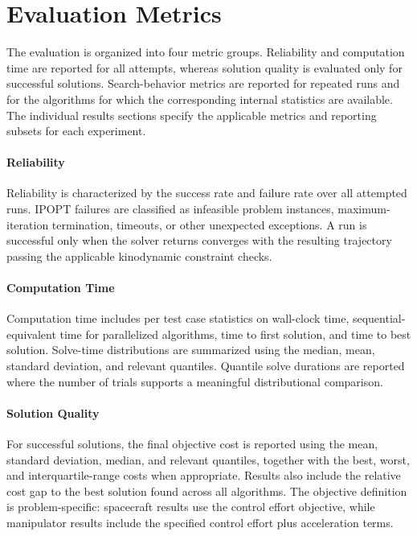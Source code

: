 \section{Evaluation Metrics}
\label{sec:setup_metrics}

The evaluation is organized into four metric groups. 
Reliability and computation time are reported for all attempts, whereas solution quality is evaluated only for successful solutions. 
Search-behavior metrics are reported for repeated runs and for the algorithms for which the corresponding internal statistics are available. 
The individual results sections specify the applicable metrics and reporting subsets for each experiment.

\paragraph{Reliability}
Reliability is characterized by the success rate and failure rate over all attempted runs. 
\ac{IPOPT} failures are classified as infeasible problem instances, maximum-iteration termination, timeouts, or other unexpected exceptions. 
A run is successful only when the solver returns converges with the resulting trajectory passing the applicable kinodynamic constraint checks.

\paragraph{Computation Time}
Computation time includes per test case statistics on wall-clock time, sequential-equivalent time for parallelized algorithms, time to first solution, and time to best solution. 
Solve-time distributions are summarized using the median, mean, standard deviation, and relevant quantiles. 
Quantile solve durations are reported where the number of trials supports a meaningful distributional comparison.

\paragraph{Solution Quality}
For successful solutions, the final objective cost is reported using the mean, standard deviation, median, and relevant quantiles, together with the best, worst, and interquartile-range costs when appropriate. 
Results also include the relative cost gap to the best solution found across all algorithms. 
The objective definition is problem-specific: spacecraft results use the control effort objective, while manipulator results include the specified control effort plus acceleration terms.

